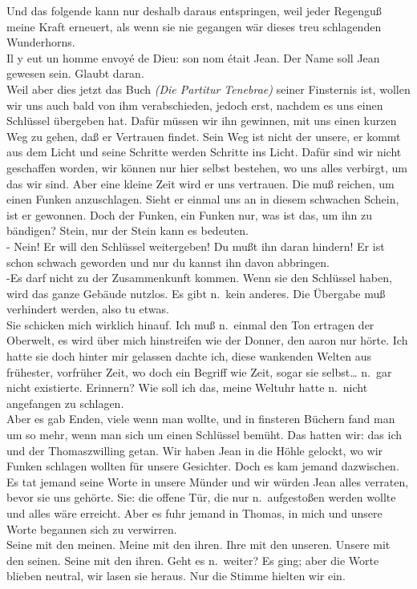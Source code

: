 \documentclass[
]{article}
\begin{document}
Und das folgende kann nur deshalb daraus entspringen, weil jeder
Regenguß meine Kraft erneuert, als wenn sie nie gegangen wär dieses treu
schlagenden Wunderhorns.\\
Il y eut un homme envoyé de Dieu: son nom était Jean. Der Name soll Jean
gewesen sein. Glaubt daran.\\
Weil aber dies jetzt das Buch \emph{(Die Partitur Tenebrae)} seiner
Finsternis ist, wollen wir uns auch bald von ihm verabschieden, jedoch
erst, nachdem es uns einen Schlüssel übergeben hat. Dafür müssen wir ihn
gewinnen, mit uns einen kurzen Weg zu gehen, daß er Vertrauen findet.
Sein Weg ist nicht der unsere, er kommt aus dem Licht und seine Schritte
werden Schritte ins Licht. Dafür sind wir nicht geschaffen worden, wir
können nur hier selbst bestehen, wo uns alles verbirgt, um das wir sind.
Aber eine kleine Zeit wird er uns vertrauen. Die muß reichen, um einen
Funken anzuschlagen. Sieht er einmal uns an in diesem schwachen Schein,
ist er gewonnen. Doch der Funken, ein Funken nur, was ist das, um ihn zu
bändigen? Stein, nur der Stein kann es bedeuten.\\
- Nein! Er will den Schlüssel weitergeben! Du mußt ihn daran hindern! Er
ist schon schwach geworden und nur du kannst ihn davon abbringen.\\
-Es darf nicht zu der Zusammenkunft kommen. Wenn sie den Schlüssel
haben, wird das ganze Gebäude nutzlos. Es gibt n.~kein anderes. Die
Übergabe muß verhindert werden, also tu etwas.\\
Sie schicken mich wirklich hinauf. Ich muß n.~einmal den Ton ertragen
der Oberwelt, es wird über mich hinstreifen wie der Donner, den aaron
nur hörte. Ich hatte sie doch hinter mir gelassen dachte ich, diese
wankenden Welten aus frühester, vorfrüher Zeit, wo doch ein Begriff wie
Zeit, sogar sie selbst\ldots{} n.~gar nicht existierte. Erinnern? Wie
soll ich das, meine Weltuhr hatte n.~nicht angefangen zu schlagen.\\
Aber es gab Enden, viele wenn man wollte, und in finsteren Büchern fand
man um so mehr, wenn man sich um einen Schlüssel bemüht. Das hatten wir:
das ich und der Thomaszwilling getan. Wir haben Jean in die Höhle
gelockt, wo wir Funken schlagen wollten für unsere Gesichter. Doch es
kam jemand dazwischen. Es tat jemand seine Worte in unsere Münder und
wir würden Jean alles verraten, bevor sie uns gehörte. Sie: die offene
Tür, die nur n.~aufgestoßen werden wollte und alles wäre erreicht. Aber
es fuhr jemand in Thomas, in mich und unsere Worte begannen sich zu
verwirren.\\
Seine mit den meinen. Meine mit den ihren. Ihre mit den unseren. Unsere
mit den seinen. Seine mit den ihren. Geht es n.~weiter? Es ging; aber
die Worte blieben neutral, wir lasen sie heraus. Nur die Stimme hielten
wir ein.
\end{document}
